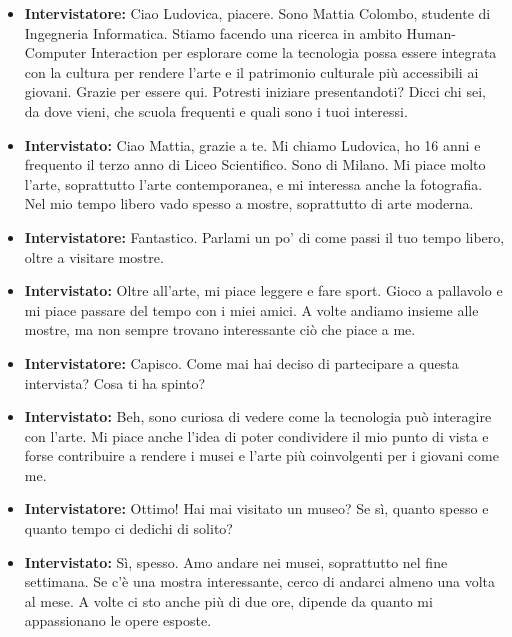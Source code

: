 \documentclass{article}
\begin{document}
\begin{itemize}
    \item \textbf{Intervistatore:} Ciao Ludovica, piacere. Sono Mattia Colombo, studente di Ingegneria Informatica. Stiamo facendo una ricerca in ambito Human-Computer Interaction per esplorare come la tecnologia possa essere integrata con la cultura per rendere l'arte e il patrimonio culturale più accessibili ai giovani. Grazie per essere qui. Potresti iniziare presentandoti? Dicci chi sei, da dove vieni, che scuola frequenti e quali sono i tuoi interessi.

    \item \textbf{Intervistato:} Ciao Mattia, grazie a te. Mi chiamo Ludovica, ho 16 anni e frequento il terzo anno di Liceo Scientifico. Sono di Milano. Mi piace molto l’arte, soprattutto l’arte contemporanea, e mi interessa anche la fotografia. Nel mio tempo libero vado spesso a mostre, soprattutto di arte moderna.

    \item \textbf{Intervistatore:} Fantastico. Parlami un po’ di come passi il tuo tempo libero, oltre a visitare mostre.

    \item \textbf{Intervistato:} Oltre all'arte, mi piace leggere e fare sport. Gioco a pallavolo e mi piace passare del tempo con i miei amici. A volte andiamo insieme alle mostre, ma non sempre trovano interessante ciò che piace a me.

    \item \textbf{Intervistatore:} Capisco. Come mai hai deciso di partecipare a questa intervista? Cosa ti ha spinto?

    \item \textbf{Intervistato:} Beh, sono curiosa di vedere come la tecnologia può interagire con l’arte. Mi piace anche l’idea di poter condividere il mio punto di vista e forse contribuire a rendere i musei e l’arte più coinvolgenti per i giovani come me.

    \item \textbf{Intervistatore:} Ottimo! Hai mai visitato un museo? Se sì, quanto spesso e quanto tempo ci dedichi di solito?

    \item \textbf{Intervistato:} Sì, spesso. Amo andare nei musei, soprattutto nel fine settimana. Se c’è una mostra interessante, cerco di andarci almeno una volta al mese. A volte ci sto anche più di due ore, dipende da quanto mi appassionano le opere esposte.


\end{itemize}
\end{document}

